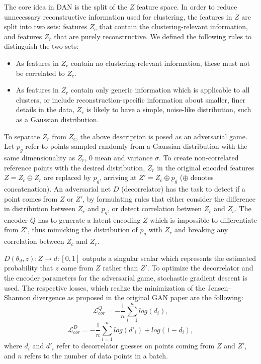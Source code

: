 			The core idea in \ac{DAN} is the split of the $Z$ feature space.
			In order to reduce unnecessary reconstructive information used for clustering, the features in $Z$ are split into two sets: features $Z_c$ that contain the clustering-relevant information, and features $Z_r$ that are purely reconstructive.
			We defined the following rules to distinguish the two sets:
			\begin{itemize}
				\item As features in $Z_r$ contain no clustering-relevant information, these must not be correlated to $Z_c$.
				\item As features in $Z_r$ contain only generic information which is applicable to all clusters, or include reconstruction-specific information about smaller, finer details in the data, $Z_r$ is likely to have a simple, noise-like distribution, such as a Gaussian distribution.
			\end{itemize}	
			
			To separate $Z_r$ from $Z_c$, the above description is posed as an adversarial game.
			Let $p_g$ refer to points sampled randomly from a Gaussian distribution with the same dimensionality as $Z_r$, $0$ mean and variance $\sigma$.
			To create non-correlated reference points with the desired distribution, $Z_r$ in the original encoded features $Z = Z_c \oplus Z_r$ are replaced by $p_g$, arriving at $Z' = Z_c \oplus p_g$ ($\oplus$ denotes concatenation).
			An adversarial net $D$ (decorrelator) has the task to detect if a point comes from $Z$ or $Z'$, by formulating rules that either consider the difference in distribution between $Z_r$ and $p_g$, or detect correlation between $Z_r$ and $Z_c$.
			The encoder $Q$ has to generate a latent encoding $Z$ which is impossible to differentiate from $Z'$, thus mimicking the distribution of $p_g$ with $Z_r$ and breaking any correlation between $Z_c$ and $Z_r$.
			
			$D(\theta_{d}, z): Z \rightarrow d:[0, 1]$ outputs a singular scalar which represents the estimated probability that $z$ came from $Z$ rather than $Z'$.
			To optimize the decorrelator and the encoder parameters for the adversarial game, stochastic gradient descent is used.
			The respective losses, which realize the minimization of the Jensen–Shannon divergence as proposed in the original \ac{GAN} paper \cite{gan} are the following:
			\begin{equation}
			\label{eq:l_q_cor}
			\mathcal{L}^Q_{cor} = -\frac{1}{n} \sum_{i=1}^{n} log(d_i),
			\end{equation}			
			\begin{equation}
			\label{eq:l_d_cor}
			\mathcal{L}^D_{cor} = -\frac{1}{n} \sum_{i=1}^{n} log(d'_i) + log(1 - d_i),
			\end{equation}
			\noindent where $d_i$ and $d'_i$ refer to decorrelator guesses on points coming from $Z$ and $Z'$, and $n$ refers to the number of data points in a batch.		
			
